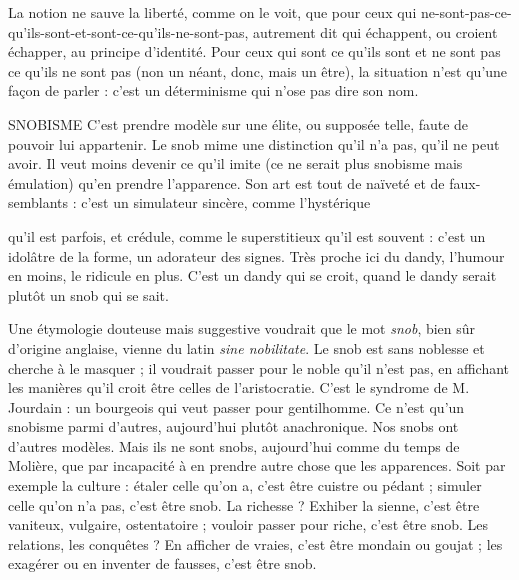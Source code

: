 La notion ne sauve la liberté, comme on le voit, que pour ceux qui
ne-sont-pas-ce-qu'ils-sont-et-sont-ce-qu'ils-ne-sont-pas, autrement dit qui échappent,
ou croient échapper, au principe d'identité. Pour ceux qui sont ce qu’ils sont et
ne sont pas ce qu'ils ne sont pas (non un néant, donc, mais un être), la situation
n’est qu’une façon de parler : c’est un déterminisme qui n’ose pas dire son
nom.

SNOBISME C’est prendre modèle sur une élite, ou supposée telle, faute de
pouvoir lui appartenir. Le snob mime une distinction qu’il n’a
pas, qu’il ne peut avoir. Il veut moins devenir ce qu'il imite (ce ne serait plus
snobisme mais émulation) qu’en prendre l'apparence. Son art est tout de naïveté
et de faux-semblants : c’est un simulateur sincère, comme l’hystérique

qu'il est parfois, et crédule, comme le superstitieux qu'il est souvent : c’est un
idolâtre de la forme, un adorateur des signes. Très proche ici du dandy,
l’humour en moins, le ridicule en plus. C’est un dandy qui se croit, quand le
dandy serait plutôt un snob qui se sait.

Une étymologie douteuse mais suggestive voudrait que le mot {\it snob}, bien
sûr d’origine anglaise, vienne du latin {\it sine nobilitate}. Le snob est sans noblesse
et cherche à le masquer ; il voudrait passer pour le noble qu’il n’est pas, en affichant
les manières qu’il croit être celles de l'aristocratie. C’est le syndrome de
M. Jourdain : un bourgeois qui veut passer pour gentilhomme. Ce n’est qu’un
snobisme parmi d’autres, aujourd’hui plutôt anachronique. Nos snobs ont
d’autres modèles. Mais ils ne sont snobs, aujourd’hui comme du temps de
Molière, que par incapacité à en prendre autre chose que les apparences. Soit
par exemple la culture : étaler celle qu’on a, c’est être cuistre ou pédant ;
simuler celle qu’on n’a pas, c’est être snob. La richesse ? Exhiber la sienne, c’est
être vaniteux, vulgaire, ostentatoire ; vouloir passer pour riche, c’est être snob.
Les relations, les conquêtes ? En afficher de vraies, c’est être mondain ou
goujat ; les exagérer ou en inventer de fausses, c’est être snob.

